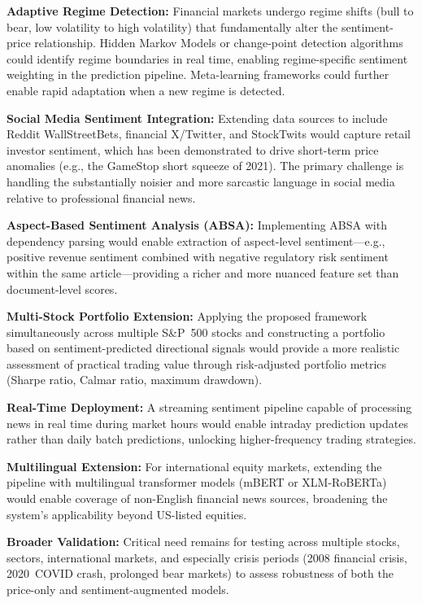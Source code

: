 \textbf{Adaptive Regime Detection:} Financial markets undergo regime shifts (bull to bear, low volatility to high volatility) that fundamentally alter the sentiment-price relationship. Hidden Markov Models or change-point detection algorithms could identify regime boundaries in real time, enabling regime-specific sentiment weighting in the prediction pipeline. Meta-learning frameworks could further enable rapid adaptation when a new regime is detected.

\textbf{Social Media Sentiment Integration:} Extending data sources to include Reddit WallStreetBets, financial X/Twitter, and StockTwits would capture retail investor sentiment, which has been demonstrated to drive short-term price anomalies (e.g., the GameStop short squeeze of 2021). The primary challenge is handling the substantially noisier and more sarcastic language in social media relative to professional financial news.

\textbf{Aspect-Based Sentiment Analysis (ABSA):} Implementing ABSA with dependency parsing would enable extraction of aspect-level sentiment---e.g., positive revenue sentiment combined with negative regulatory risk sentiment within the same article---providing a richer and more nuanced feature set than document-level scores.

\textbf{Multi-Stock Portfolio Extension:} Applying the proposed framework simultaneously across multiple S\&P~500 stocks and constructing a portfolio based on sentiment-predicted directional signals would provide a more realistic assessment of practical trading value through risk-adjusted portfolio metrics (Sharpe ratio, Calmar ratio, maximum drawdown).

\textbf{Real-Time Deployment:} A streaming sentiment pipeline capable of processing news in real time during market hours would enable intraday prediction updates rather than daily batch predictions, unlocking higher-frequency trading strategies.

\textbf{Multilingual Extension:} For international equity markets, extending the pipeline with multilingual transformer models (mBERT or XLM-RoBERTa) would enable coverage of non-English financial news sources, broadening the system's applicability beyond US-listed equities.

\textbf{Broader Validation:} Critical need remains for testing across multiple stocks, sectors, international markets, and especially crisis periods (2008 financial crisis, 2020~COVID crash, prolonged bear markets) to assess robustness of both the price-only and sentiment-augmented models.

